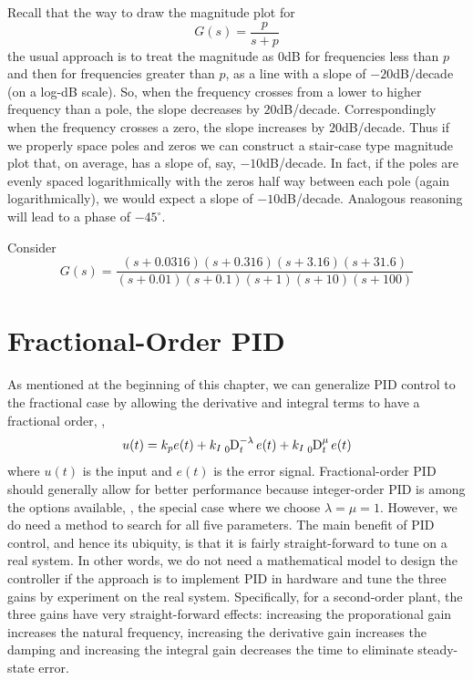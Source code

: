 Recall that the way to draw the magnitude plot for
\begin{equation*}
  G(s)= \frac{p}{s+p}
\end{equation*}
the usual approach is to treat the magnitude as $0$dB for frequencies less than $p$ and then for frequencies greater than $p$, as a line with a slope of $-20$dB/decade (on a log-dB scale). So, when the frequency crosses from a lower to higher frequency than a pole, the slope decreases by $20$dB/decade. Correspondingly when the frequency crosses a zero, the slope increases by $20$dB/decade. Thus if we properly space poles and zeros we can construct a stair-case type magnitude plot that, on average, has a slope of, say, $-10$dB/decade. In fact, if the poles are evenly spaced logarithmically with the zeros half way between each pole (again logarithmically), we would expect a slope of $-10$dB/decade. Analogous reasoning will lead to a phase of $-45^\circ$.

\begin{example}
  Consider 
  \begin{equation}
    G(s) = \frac{ \left(s + 0.0316 \right) \left(s + 0.316 \right)  \left(s + 3.16 \right) \left(s + 31.6 \right)  
    }{\left(s+0.01 \right)\left(s+0.1 \right) \left(s+1 \right) \left(s+10 \right) \left(s+100 \right)} 
    \label{eq:PID}
  \end{equation}
\end{example}

\section{Fractional-Order PID}
As mentioned at the beginning of this chapter, we can generalize PID control to the fractional case by allowing the derivative and integral terms to have a fractional order, \ie, 
\begin{equation*}
  u(t) = k_p e(t) + k_I \tensor*[_0]\D{^{-\lambda}_t} e(t) + k_I \tensor*[_0]\D{^{\mu}_t} e(t)
\end{equation*}
where $u(t)$ is the input and $e(t)$ is the error signal. Fractional-order PID should generally allow for better performance because integer-order PID is among the options available, \ie, the special case where we choose $\lambda = \mu = 1$. However, we do need a method to search for all five parameters. The main benefit of PID control, and hence its ubiquity, is that it is fairly straight-forward to tune on a real system. In other words, we do not need a mathematical model to design the controller if the approach is to implement PID in hardware and tune the three gains by experiment on the real system. Specifically, for a second-order plant, the three gains have very straight-forward effects: increasing the proporational gain increases the natural frequency, increasing the derivative gain increases the damping and increasing the integral gain decreases the time to eliminate steady-state error.

